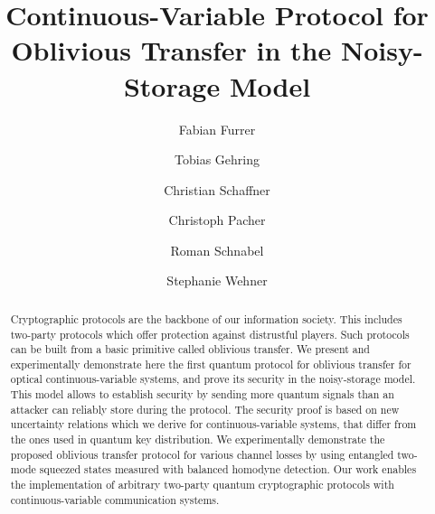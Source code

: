 \documentclass[aps,amsfonts,twoside,amssymb,superscriptaddress,twocolumn]{revtex4-1}
\begin{document}
\title{Continuous-Variable Protocol for Oblivious Transfer in the Noisy-Storage Model}

\author{Fabian Furrer}

\author{Tobias Gehring}

\author{Christian Schaffner} 

\author{Christoph Pacher} 

\author{Roman Schnabel} 

\author{Stephanie Wehner} 


\begin{abstract}
Cryptographic protocols are the backbone of our information society. 
This includes two-party protocols which offer protection against distrustful players.
Such protocols can be built from a basic primitive called oblivious transfer. 
We present and experimentally demonstrate here the first quantum protocol for oblivious transfer for optical continuous-variable systems, and prove its security in the noisy-storage model. 
This model allows to establish security by sending more quantum signals than an attacker can reliably store during the protocol. 
The security proof is based on new uncertainty relations which we derive for continuous-variable systems, that differ from the ones used in quantum key distribution.
We experimentally demonstrate the proposed oblivious transfer protocol for various channel losses by using entangled two-mode squeezed states measured with balanced homodyne detection.
Our work enables the implementation of arbitrary two-party quantum cryptographic protocols with continuous-variable communication systems.

\end{abstract}
\end{document}
